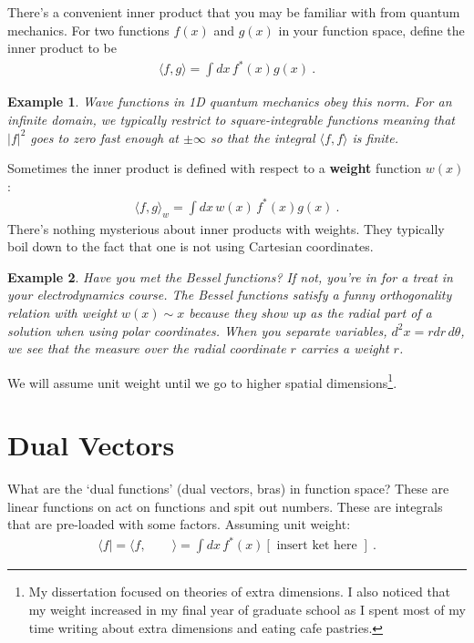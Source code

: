 \documentclass[
  11pt,
	colorful,
	raggedright,
]{tufte-style-thesis-flip}
\newtheorem{example}{Example}[section]
\begin{document}
There's a convenient inner product that you may be familiar with from quantum mechanics. For two functions $f(x)$ and $g(x)$ in your function space, define the inner product to be
\begin{align}
  \langle f,g\rangle 
  =
  \int dx\, f^*(x)g(x) \ .
  \label{eq:L2:inner:product}
\end{align}
\begin{example}
Wave functions in 1D quantum mechanics obey this norm. For an infinite domain, we typically restrict to square-integrable functions meaning that $|f|^2$ goes to zero fast enough at $\pm \infty$ so that the integral $\langle f, f\rangle$ is finite. 
\end{example}
Sometimes the inner product is defined with respect to a \textbf{weight} function $w(x)$:
\begin{align}
  \langle f,g\rangle_w 
  =
  \int dx\, w(x)\, f^*(x)g(x) \ .
  \label{eq:weighted:inner:product}
\end{align}
There's nothing mysterious about inner products with weights. They typically boil down to the fact that one is not using Cartesian coordinates. 
\begin{example}
Have you met the Bessel functions? If not, you're in for a treat in your electrodynamics course. The Bessel functions satisfy a funny orthogonality relation with weight $w(x)\sim x$ because they show up as the radial part of a solution when using polar coordinates. When you separate variables, $d^2x = rdr\,d\theta$, we see that the measure over the radial coordinate $r$ carries a \emph{weight} $r$.
\end{example}
We will assume unit weight until we go to higher spatial dimensions\footnote{My dissertation focused on theories of extra dimensions. I also noticed that my weight increased in my final year of graduate school as I spent most of my time writing about extra dimensions and eating cafe pastries.}.


\section{Dual Vectors}

What are the `dual functions' (dual vectors, bras) in function space? These are linear functions on act on functions and spit out numbers. These are integrals that are pre-loaded with some factors. Assuming unit weight:
\begin{align}
  \langle f | = \langle f, \qquad \rangle
  = 
  \int dx \, f^*(x) \left[\text{ insert ket here }\right] \ .
\end{align}
\end{document}

